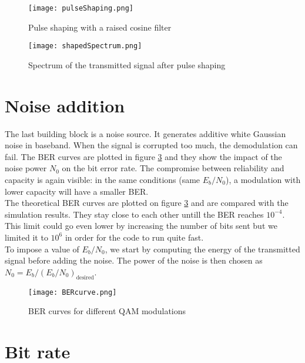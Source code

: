 \begin{figure}[H]
    \centering
    \texttt{[image: pulseShaping.png]}
    \caption{Pulse shaping with a raised cosine filter}
    \label{fig:pulseShaping}
\end{figure}

\begin{figure}[H]
    \centering
    \texttt{[image: shapedSpectrum.png]}
    \caption{Spectrum of the transmitted signal after pulse shaping}
    \label{fig:shapedSpectrum}
\end{figure}

\section{Noise addition}

The last building block is a noise source. It generates additive white Gaussian noise in baseband. When the signal is corrupted too much, the demodulation can fail. The BER curves are plotted in figure \ref{fig:BER} and they show the impact of the noise power $N_0$ on the bit error rate. The compromise between reliability and capacity is again visible: in the same conditions (same $E_b/N_0$), a modulation with lower capacity will have a smaller BER. \\

The theoretical BER curves are plotted on figure \ref{fig:BER} and are compared with the simulation results. They stay close to each other untill the BER reaches $10^{-4}$. This limit could go even lower by increasing the number of bits sent but we limited it to $10^6$ in order for the code to run quite fast. \\

To impose a value of $E_b/N_0$, we start by computing the energy of the transmitted signal before adding the noise. The power of the noise is then chosen as $N_0 = E_b / (E_b/N_0)_{\text{desired}}$. \\

\begin{figure}[H]
    \centering
    \texttt{[image: BERcurve.png]}
    \caption{BER curves for different QAM modulations}
    \label{fig:BER}
\end{figure}

\section{Bit rate}

